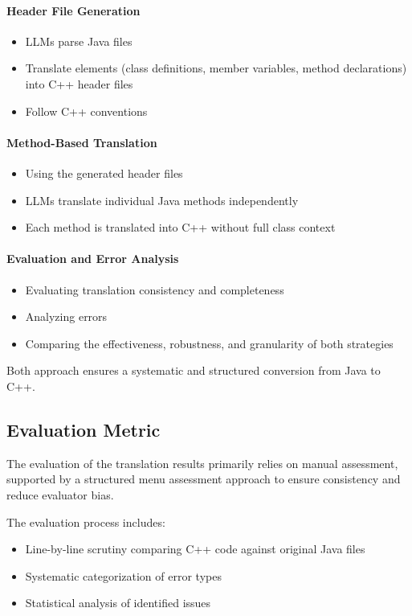 \paragraph{Header File Generation}
\begin{itemize}
    \item LLMs parse Java files
    \item Translate elements (class definitions, member variables, method declarations) into C++ header files
    \item Follow C++ conventions
\end{itemize}

\paragraph{Method-Based Translation}
\begin{itemize}
    \item Using the generated header files
    \item LLMs translate individual Java methods independently
    \item Each method is translated into C++ without full class context
\end{itemize}

\paragraph{Evaluation and Error Analysis}
\begin{itemize}
    \item Evaluating translation consistency and completeness
    \item Analyzing errors
    \item Comparing the effectiveness, robustness, and granularity of both strategies
\end{itemize}

Both approach ensures a systematic and structured conversion from Java to C++.

\subsection{Evaluation Metric}

The evaluation of the translation results primarily relies on manual assessment, supported by a structured menu assessment approach to ensure consistency and reduce evaluator bias.

The evaluation process includes:

\begin{itemize}
    \item Line-by-line scrutiny comparing C++ code against original Java files
    \item Systematic categorization of error types
    \item Statistical analysis of identified issues
\end{itemize}

